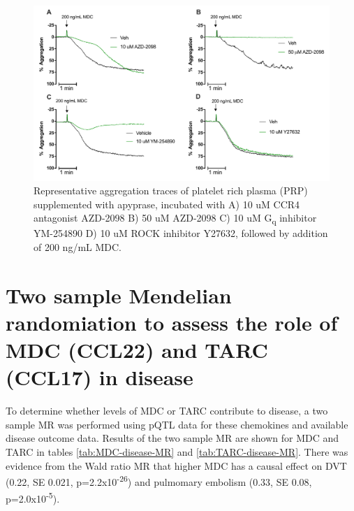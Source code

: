 \documentclass[11pt,twoside]{bristolthesis}
\begin{document}
\begin{figure}
\includegraphics[width=0.95\linewidth]{figure/Chemokines/Layouts/MDC_inhibitors_aggregation_traces} \caption[Aggregation traces of the effect of inhibitors on MDC induced platelet aggregation in PRP.]{Representative aggregation traces of platelet rich plasma (PRP) supplemented with apyprase, incubated with A) 10 uM CCR4 antagonist AZD-2098 B) 50 uM AZD-2098 C) 10 uM G\textsubscript{q} inhibitor YM-254890 D) 10 uM ROCK inhibitor Y27632, followed by addition of 200 ng/mL MDC.}\label{fig:MDC-PRP-agg-trace}
\end{figure}
\hypertarget{two-sample-mendelian-randomiation-to-assess-the-role-of-mdc-ccl22-and-tarc-ccl17-in-disease}{%
\section{Two sample Mendelian randomiation to assess the role of MDC (CCL22) and TARC (CCL17) in disease}\label{two-sample-mendelian-randomiation-to-assess-the-role-of-mdc-ccl22-and-tarc-ccl17-in-disease}}

To determine whether levels of MDC or TARC contribute to disease, a two sample MR was performed using pQTL data for these chemokines and available disease outcome data. Results of the two sample MR are shown for MDC and TARC in tables \ref{tab:MDC-disease-MR} and \ref{tab:TARC-disease-MR}. There was evidence from the Wald ratio MR that higher MDC has a causal effect on DVT (0.22, SE 0.021, p=2.2x10\textsuperscript{-26}) and pulmomary embolism (0.33, SE 0.08, p=2.0x10\textsuperscript{-5}).
\end{document}

